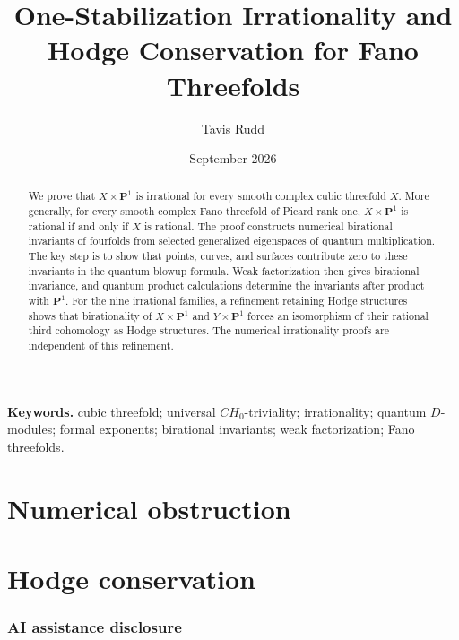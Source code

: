 \documentclass[11pt]{article}
\title{One-Stabilization Irrationality and Hodge Conservation for Fano Threefolds}
\author{Tavis Rudd}
\date{September 2026}
\numberwithin{equation}{section}
\theoremstyle{definition}
\theoremstyle{remark}
\newcommand{\PP}{\mathbf P}
\begin{document}
\maketitle

\begin{abstract}
We prove that $X\times\PP^1$ is irrational for every smooth complex cubic
threefold $X$. More generally, for every smooth complex Fano threefold of
Picard rank one, $X\times\PP^1$ is rational if and only if $X$ is rational.
The proof constructs numerical birational invariants of fourfolds from
selected generalized eigenspaces of quantum multiplication. The key step
is to show that points, curves, and surfaces contribute zero to these
invariants in the quantum blowup formula. Weak factorization then gives
birational invariance, and quantum product calculations determine the
invariants after product with $\PP^1$. For the nine irrational families,
a refinement retaining Hodge structures shows that birationality of
$X\times\PP^1$ and $Y\times\PP^1$ forces an isomorphism of their rational
third cohomology as Hodge structures. The numerical irrationality proofs
are independent of this refinement.
\end{abstract}

\noindent\textbf{Keywords.} cubic threefold; universal \(CH_0\)-triviality;
irrationality; quantum \(D\)-modules; formal exponents; birational invariants;
weak factorization; Fano threefolds.


\part{Numerical obstruction}\label{part:numerical}





\part{Hodge conservation}\label{part:hodge}


\appendix






\section*{AI assistance disclosure}
\end{document}
